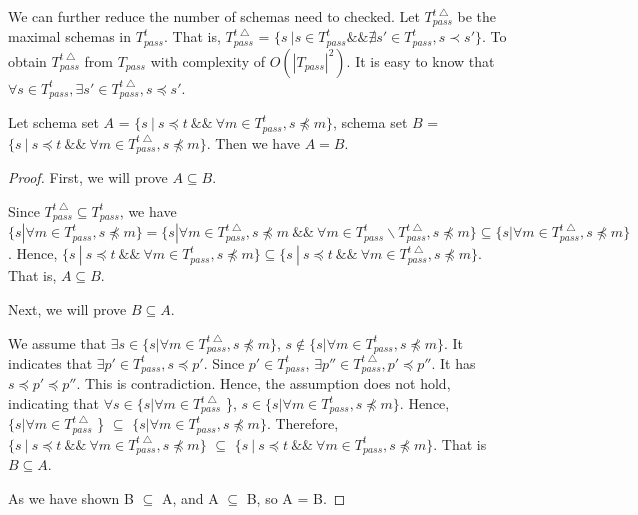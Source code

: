 We can further reduce the number of schemas need to checked. Let $T_{pass}^{t\bigtriangleup}$ be the maximal schemas in $T_{pass}^{t}$. That is, $T_{pass}^{t\bigtriangleup}$ = $\{ s\ |  s \in T_{pass}^{t} \&\& \nexists s'  \in T_{pass}^{t}, s \prec s' \}$.  To obtain $T_{pass}^{t\bigtriangleup}$ from $T_{pass}$ with complexity of $O(|T_{pass}|^{2})$. It is easy to know that $\forall s \in T_{pass}^{t}, \exists s' \in T_{pass}^{t\bigtriangleup},  s \preceq s'$.

\begin{proposition}\label{pro:healthysintequal2}
Let schema set $A$ = $\{ s\ |\ s \preceq t\ \&\&\ \forall m \in T_{pass}^{t}, s \npreceq m \}$, schema set $B$ = $\{ s\ |\ s \preceq t\ \&\&\ \forall m \in T_{pass}^{t\bigtriangleup}, s \npreceq m \}$. Then we have $A = B$.
\end{proposition}

\begin{proof}

First, we will prove $A \subseteq B$.

Since $T_{pass}^{t\bigtriangleup} \subseteq T_{pass}^{t}$, we have $  \{ s | \forall m \in T_{pass}^{t}, s \npreceq m \} =  \{ s | \forall m \in T_{pass}^{t\bigtriangleup}, s \npreceq m \ \&\& \  \forall m \in T_{pass}^{t} \backslash T_{pass}^{t\bigtriangleup}, s \npreceq m \} \subseteq \{ s | \forall m \in T_{pass}^{t\bigtriangleup}, s \npreceq m \}$. Hence,  $\{ s\ |\ s \preceq t\ \&\&\ \forall m \in T_{pass}^{t}, s \npreceq m \} \subseteq  \{ s\ |\ s \preceq t\ \&\&\ \forall m \in T_{pass}^{t\bigtriangleup}, s \npreceq m \}$. That is,  $A \subseteq B$.

Next, we will prove $B \subseteq A$.

We assume that  $\exists s \in  \{ s | \forall m \in T_{pass}^{t\bigtriangleup}, s \npreceq m \}$, $ s \notin \{ s | \forall m \in T_{pass}^{t}, s \npreceq m \}$. It indicates that $\exists p' \in T_{pass}^{t}, s \preceq p'$. Since $p' \in T_{pass}^{t}$, $\exists p'' \in T_{pass}^{t\bigtriangleup}, p' \preceq p''$. It has $s \preceq p' \preceq p''$. This is contradiction.  Hence, the assumption does not hold, indicating that $\forall s \in  \{ s | \forall m \in T_{pass}^{t\bigtriangleup}$ \}, $s \in  \{ s | \forall m \in T_{pass}^{t}, s \npreceq m \}$. Hence, $\{ s | \forall m \in T_{pass}^{t\bigtriangleup}$ \} $\subseteq$ $\{ s | \forall m \in T_{pass}^{t}, s \npreceq m \}$. Therefore, $\{ s\ |\ s \preceq t\ \&\&\ \forall m \in T_{pass}^{t\bigtriangleup}, s \npreceq m \}$ $\subseteq$ $\{ s\ |\ s \preceq t\ \&\&\ \forall m \in T_{pass}^{t}, s \npreceq m \} $. That is $B \subseteq A$.

As we have shown B $\subseteq$ A, and A $\subseteq$ B, so A = B.
\end{proof}

